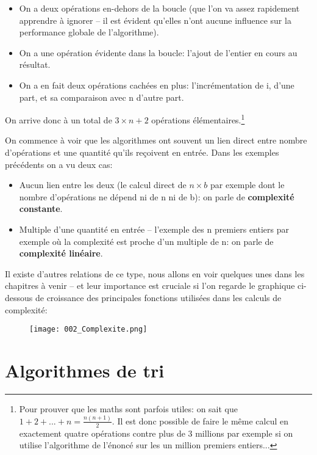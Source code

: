 \documentclass[12pt]{article}
\begin{document}
	\begin{MaReponse}
		\begin{itemize}
			\item On a deux opérations en-dehors de la boucle (que l'on va assez rapidement apprendre à ignorer -- il est évident qu'elles n'ont aucune influence sur la performance globale de l'algorithme).
			\item On a une opération évidente dans la boucle: l'ajout de l'entier en cours au résultat.
			\item On a en fait deux opérations cachées en plus: l'incrémentation de i, d'une part, et sa comparaison avec n d'autre part.
		\end{itemize}
		
		On arrive donc à un total de $3 \times n + 2$ opérations élémentaires.\footnote{Pour prouver que les maths sont parfois utiles: on sait que $1 + 2 + ... + n = \frac{n(n + 1)}{2}$. Il est donc possible de faire le même calcul en exactement quatre opérations contre plus de 3 millions par exemple si on utilise l'algorithme de l'énoncé sur les un million premiers entiers...}
	\end{MaReponse}
	
	On commence à voir que les algorithmes ont souvent un lien direct entre nombre d'opérations et une quantité qu'ils reçoivent en entrée. Dans les exemples précédents on a vu deux cas:
	\begin{itemize}
		\item Aucun lien entre les deux (le calcul direct de $n \times b$ par exemple dont le nombre d'opérations ne dépend ni de n ni de b): on parle de \textbf{complexité constante}.
		\item Multiple d'une quantité en entrée -- l'exemple des n premiers entiers par exemple où la complexité est proche d'un multiple de n: on parle de \textbf{complexité linéaire}.
	\end{itemize}
	
	Il existe d'autres relations de ce type, nous allons en voir quelques unes dans les chapitres à venir -- et leur importance est cruciale si l'on regarde le graphique ci-dessous de croissance des principales fonctions utilisées dans les calculs de complexité:
	
	\begin{figure}[ht]
		\centering
		\texttt{[image: 002\_Complexite.png]}
	\end{figure}
	
	
			
	\pagebreak
	\section{Algorithmes de tri}
	
\end{document}
